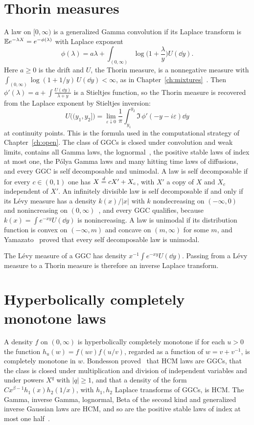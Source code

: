 \section{Thorin measures}

A law on $[0,\infty)$ is a generalized Gamma convolution if its Laplace transform is $\mathbb{E} e^{-\lambda X} = e^{-\phi(\lambda)}$ with Laplace exponent
\[
\phi(\lambda) = a\lambda+\int_{(0,\infty)}\log\Big(1+\frac\lambda y\Big)U(\dd y).
\]
Here $a\geq0$ is the drift and $U$, the Thorin measure, is a nonnegative measure with $\int_{(0,\infty)}\log(1+1/y)\,U(\dd y)<\infty$, as in Chapter~\ref{ch:mixtures}~\cite[Chapter 3]{bondesson1992}. Then $\phi'(\lambda) = a+\int\frac{U(\dd y)}{\lambda+y}$ is a Stieltjes function, so the Thorin measure is recovered from the Laplace exponent by Stieltjes inversion:
\[
U\big((y_1,y_2]\big) = \lim_{\varepsilon\downarrow0}\frac1\pi\int_{y_1}^{y_2}\Im\,\phi'(-y-i\varepsilon)\dd y
\]
at continuity points. This is the formula used in the computational strategy of Chapter~\ref{ch:open}. The class of GGCs is closed under convolution and weak limits, contains all Gamma laws, the lognormal~\cite{thorin1977}, the positive stable laws of index at most one, the P\'olya Gamma laws and many hitting time laws of diffusions, and every GGC is self decomposable and unimodal. A law is self decomposable if for every $c\in(0,1)$ one has $X\stackrel{d}{=} cX'+X_c$, with $X'$ a copy of $X$ and $X_c$ independent of $X'$. An infinitely divisible law is self decomposable if and only if its L\'evy measure has a density $k(x)/|x|$ with $k$ nondecreasing on $(-\infty,0)$ and nonincreasing on $(0,\infty)$~\cite{sato1999}, and every GGC qualifies, because $k(x) = \int e^{-xy}U(\dd y)$ is nonincreasing. A law is unimodal if its distribution function is convex on $(-\infty,m)$ and concave on $(m,\infty)$ for some $m$, and Yamazato~\cite{yamazato1978} proved that every self decomposable law is unimodal.

The L\'evy measure of a GGC has density $x^{-1}\int e^{-xy}U(\dd y)$. Passing from a L\'evy measure to a Thorin measure is therefore an inverse Laplace transform.

\section{Hyperbolically completely monotone laws}

A density $f$ on $(0,\infty)$ is hyperbolically completely monotone if for each $u>0$ the function $h_u(w) = f(uv)f(u/v)$, regarded as a function of $w = v+v^{-1}$, is completely monotone in $w$. Bondesson proved~\cite[Chapter 5]{bondesson1992} that HCM laws are GGCs, that the class is closed under multiplication and division of independent variables and under powers $X^q$ with $|q|\geq1$, and that a density of the form $Cx^{\beta-1}h_1(x)h_2(1/x)$, with $h_1,h_2$ Laplace transforms of GGCs, is HCM. The Gamma, inverse Gamma, lognormal, Beta of the second kind and generalized inverse Gaussian laws are HCM, and so are the positive stable laws of index at most one half~\cite{bosch2016}.

